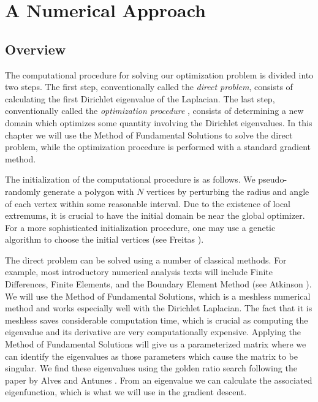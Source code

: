 \documentclass[12pt]{report}
\numberwithin{definition}{section}
\begin{document}
\break



\break

\chapter{A Numerical Approach}
\break

\section{Overview}

The computational procedure for solving our optimization problem is divided into two steps.
The first step, conventionally called the \textit{direct problem}, consists of calculating the first Dirichlet eigenvalue of the Laplacian.
The last step, conventionally called the \textit{optimization procedure} , consists of determining a new domain which optimizes some quantity involving the Dirichlet eigenvalues.
In this chapter we will use the Method of Fundamental Solutions to solve the direct problem\cite{bogomolny}, while the optimization procedure is performed with a standard gradient method\cite{snyman}\cite{wright}.

The initialization of the computational procedure is as follows. 
We pseudo-randomly generate a polygon with $N$ vertices by perturbing the radius and angle of each vertex within some reasonable interval.
Due to the existence of local extremums, it is crucial to have the initial domain be near the global optimizer.
For a more sophisticated initialization procedure, one may use a genetic algorithm to choose the initial vertices (see Freitas \cite{freitas}).

The direct problem can be solved using a number of classical methods.
For example, most introductory numerical analysis texts will include Finite Differences, Finite Elements, and the Boundary Element Method (see Atkinson \cite{atkinson}).
We will use the Method of Fundamental Solutions, which is a meshless numerical method and works especially well with the Dirichlet Laplacian.
The fact that it is meshless saves considerable computation time, which is crucial as computing the eigenvalue and its derivative are very computationally expensive.
Applying the Method of Fundamental Solutions will give us a parameterized matrix where we can identify the eigenvalues as those parameters which cause the matrix to be singular.
We find these eigenvalues using the golden ratio search following the paper by Alves and Antunes \cite{fund}.
From an eigenvalue we can calculate the associated eigenfunction, which is what we will use in the gradient descent.
\end{document}
